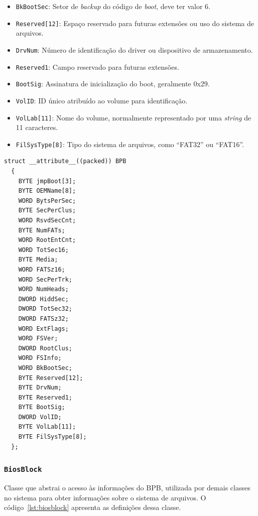 \documentclass[
    12pt,				%
    oneside,   	        %
    a4paper,			%
    english,			%
    french,				%
    spanish,			%
    brazil,				%
    ]{pacotes/abntex2}
\begin{document}
\begin{itemize}
\begin{itemize}
            \item \texttt{BkBootSec}: Setor de \textit{backup} do código de \textit{boot}, deve ter valor 6.
            \item \texttt{Reserved[12]}: Espaço reservado para futuras extensões ou uso do sistema de arquivos.
            \item \texttt{DrvNum}: Número de identificação do driver ou dispositivo de armazenamento.
            \item \texttt{Reserved1}: Campo reservado para futuras extensões.
            \item \texttt{BootSig}: Assinatura de inicialização do boot, geralmente 0x29.
            \item \texttt{VolID}: ID único atribuído ao volume para identificação.
            \item \texttt{VolLab[11]}: Nome do volume, normalmente representado por uma \textit{string} de 11 caracteres.
            \item \texttt{FilSysType[8]}: Tipo do sistema de arquivos, como ``FAT32'' ou ``FAT16''.
        \end{itemize}
\end{itemize}

\begin{lstlisting}[caption={Estrutura que representa o BPB encontrado no volume FAT}, label={lst:bpb}]
  struct __attribute__((packed)) BPB
  {
    BYTE jmpBoot[3];
    BYTE OEMName[8];
    WORD BytsPerSec;
    BYTE SecPerClus;
    WORD RsvdSecCnt;
    BYTE NumFATs;
    WORD RootEntCnt;
    WORD TotSec16;
    BYTE Media;
    WORD FATSz16;
    WORD SecPerTrk;
    WORD NumHeads;
    DWORD HiddSec;
    DWORD TotSec32;
    DWORD FATSz32;
    WORD ExtFlags;
    WORD FSVer;
    DWORD RootClus;
    WORD FSInfo;
    WORD BkBootSec;
    BYTE Reserved[12];
    BYTE DrvNum;
    BYTE Reserved1;
    BYTE BootSig;
    DWORD VolID;
    BYTE VolLab[11];
    BYTE FilSysType[8];
  };
\end{lstlisting}

\subsubsection{\texttt{BiosBlock}}
\label{subsubsec:bios_block}

Classe que abstrai o acesso às informações do BPB, utilizada por demais classes no sistema para obter informações sobre o sistema de arquivos. O código~\ref{lst:biosblock} apresenta as definições dessa classe. 
\end{document}
